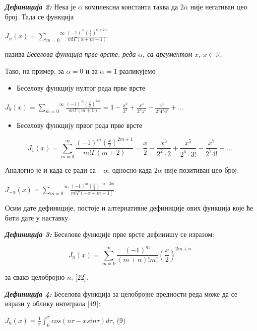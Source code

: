 \emph{\textbf{Дефиниција 2:}} Нека је \(\alpha\) комплексна константа
таква да \(2\alpha\) није негативан цео број. Тада се функција

\(J_{\alpha}(x) = \overset{\infty}{\sum_{m = 0}}\frac{{( - 1)}^{m}\left( \frac{x}{2} \right)^{\alpha + 2m}}{m!\Gamma(\alpha + m + 1)}\)

назива \emph{Беселова функција прве врсте, реда} \(\alpha\)\emph{, са
аргументом} \(x\)\emph{,} \(x\mathbb{\in R}\)\emph{.}

Тако, на пример, за \(\alpha = 0\) и за \(\alpha = 1\) разликујемо

\begin{itemize}
\item
  Беселову функцију нултог реда прве врсте
\end{itemize}

\(J_{0}(x) = \overset{\infty}{\sum_{m = 0}}\frac{{( - 1)}^{m}\left( \frac{x}{2} \right)^{2m}}{m!\Gamma(m + 1)} = 1 - \frac{x^{2}}{2^{2}} + \frac{x^{4}}{2^{2}4^{2}} - \frac{x^{6}}{2^{2}4^{2}6^{2}} + ...\)

\begin{itemize}
\item
  Беселову функцију првог реда прве врсте
\end{itemize}

\[J_{1}(x) = \overset{\infty}{\sum_{m = 0}}\frac{{( - 1)}^{m}\left( \frac{x}{2} \right)^{2m + 1}}{m!\Gamma(m + 2)} = \frac{x}{2} - \frac{x^{3}}{2^{2} \cdot 2} + \frac{x^{5}}{2^{5} \cdot 3!} - \frac{x^{7}}{2^{7}4!} + ...\]

Аналогно је и када се ради са \(- \alpha\), односно када \(2\alpha\)
није позитиван цео број:

\(J_{- \alpha}(x) = \overset{\infty}{\sum_{m = 0}}\frac{{( - 1)}^{m}\left( \frac{x}{2} \right)^{- \alpha + 2m}}{m!\Gamma( - \alpha + m + 1)}\).

Осим дате дефиниције, постоје и алтернативне дефиниције ових функција
које ће бити дате у наставку.

\emph{\textbf{Дефиниција 3:}} Беселове функције прве врсте дефинишу се
изразом:

\[J_{n}(x) = \overset{\infty}{\sum_{m = 0}}\frac{{( - 1)}^{m}}{(m + n)!m!}\left( \frac{x}{2} \right)^{2m + n}\]

за свако целобројно \(n\), {[}22{]}\emph{.}

\emph{\textbf{Дефиниција 4:}} Беселова функција за целобројне вредности
реда може да се изрази у облику интеграла {[}49{]}:

\(J_{n}(x) = \frac{1}{\pi}\int_{0}^{\pi}cos(n\tau - xsin\tau)d\tau\),
(9)

